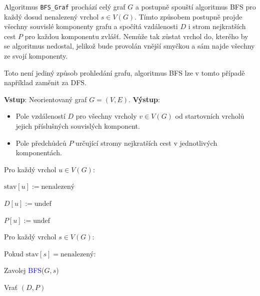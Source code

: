 \noindent Algoritmus \texttt{BFS\_Graf} prochází celý graf $G$ a postupně spouští algoritmus BFS pro každý dosud nenalezený vrchol $s \in V(G)$. Tímto způsobem postupně projde všechny souvislé komponenty grafu a spočítá vzdálenosti $D$ i strom nejkratších cest $P$ pro každou komponentu zvlášť. Nemůže tak zůstat vrchol do, kterého by se algoritmus nedostal, jelikož bude provolán vnější smyčkou a sám najde všechny ze svojí komponenty. \bigskip

\begin{remark}
    Toto není jediný způsob prohledání grafu, algoritmus BFS lze v tomto případě například zaměnit za DFS.
\end{remark} \bigskip

\noindent \textbf{Vstup}: Neorientovaný graf $G = (V, E)$. \newline
\noindent \textbf{Výstup}: 
\begin{itemize}[itemsep=-0.2em, topsep=0.1em]
    \item Pole vzdáleností $D$ pro všechny vrcholy $v \in V(G)$ od startovních vrcholů jejich příslušných souvislých komponent.
    \item Pole předchůdců $P$ určující stromy nejkratších cest v jednotlivých komponentách.
\end{itemize}

\bigskip
{}
\begin{pseudocode}
\item Pro každý vrchol $u \in V(G)$:
\item \tab $\text{stav}[u] := \text{nenalezený}$
\item \tab $D[u] := \text{undef}$
\item \tab $P[u] := \text{undef}$
\item Pro každý vrchol $s \in V(G)$:
\item \tab Pokud $\text{stav}[s] = \text{nenalezený}$:
\item \tab \tab Zavolej \textcolor{blue}{BFS}($G, s$)
\item Vrať $(D, P)$
\end{pseudocode} \bigskip

